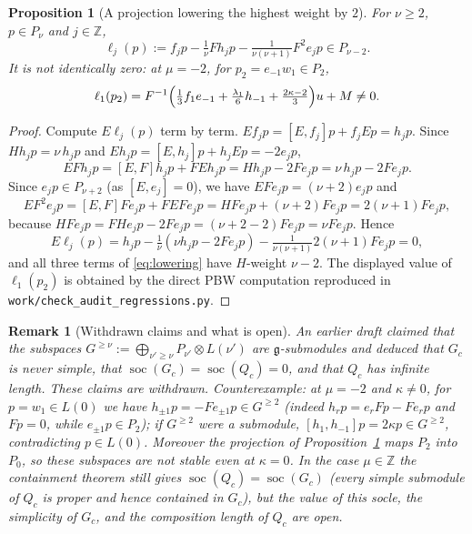 \documentclass[11pt,a4paper]{article}
\newcommand{\Z}{\mathbb Z}
\newcommand{\g}{\mathfrak g}
\newcommand{\soc}{\operatorname{soc}}
\newtheorem{proposition}[theorem]{Proposition}
\newtheorem{remark}[theorem]{Remark}
\begin{document}
\begin{proposition}[A projection lowering the highest weight by $2$]
\label{prop:lowering}
For $\nu\ge2$, $p\in P_\nu$ and $j\in\Z$,
\begin{equation}\label{eq:lowering}
 \ell_j(p):=f_jp-\tfrac1\nu Fh_jp
 -\tfrac{1}{\nu(\nu+1)}F^2e_jp\in P_{\nu-2}.
\end{equation}
It is not identically zero: at $\mu=-2$, for $p_2=e_{-1}w_1\in P_2$,
\[
 \ell_1(p_2)=F^{-1}\Bigl(\tfrac13f_1e_{-1}+\tfrac{\lambda_1}{6}h_{-1}
 +\tfrac{2\kappa-2}{3}\Bigr)u+M\ne0.
\]
\end{proposition}
\begin{proof}
Compute $E\ell_j(p)$ term by term. $Ef_jp=[E,f_j]p+f_jEp=h_jp$. Since
$Hh_jp=\nu\,h_jp$ and $Eh_jp=[E,h_j]p+h_jEp=-2e_jp$,
\[
 EFh_jp=[E,F]h_jp+FEh_jp=Hh_jp-2Fe_jp=\nu\,h_jp-2Fe_jp.
\]
Since $e_jp\in P_{\nu+2}$ (as $[E,e_j]=0$), we have $EFe_jp=(\nu+2)e_jp$
and
\[
 EF^2e_jp=[E,F]Fe_jp+FEFe_jp=HFe_jp+(\nu+2)Fe_jp=2(\nu+1)Fe_jp,
\]
because $HFe_jp=FHe_jp-2Fe_jp=(\nu+2-2)Fe_jp=\nu Fe_jp$. Hence
\[
 E\ell_j(p)=h_jp-\tfrac1\nu(\nu h_jp-2Fe_jp)
 -\tfrac{1}{\nu(\nu+1)}2(\nu+1)Fe_jp=0,
\]
and all three terms of \eqref{eq:lowering} have $H$-weight $\nu-2$. The
displayed value of $\ell_1(p_2)$ is obtained by the direct PBW computation
reproduced in \texttt{work/check\_audit\_regressions.py}.
\end{proof}

\begin{remark}[Withdrawn claims and what is open]
\label{rem:withdrawn}
An earlier draft claimed that the subspaces
$G^{\ge\nu}:=\bigoplus_{\nu'\ge\nu}P_{\nu'}\otimes L(\nu')$ are
$\g$-submodules and deduced that $G_c$ is never simple, that
$\soc(G_c)=\soc(Q_c)=0$, and that $Q_c$ has infinite length. These claims
are withdrawn. Counterexample: at $\mu=-2$ and $\kappa\ne0$, for
$p=w_1\in L(0)$ we have $h_{\pm1}p=-Fe_{\pm1}p\in G^{\ge2}$ (indeed
$h_rp=e_rFp-Fe_rp$ and $Fp=0$, while $e_{\pm1}p\in P_2$); if $G^{\ge2}$
were a submodule, $[h_1,h_{-1}]p=2\kappa p\in G^{\ge2}$, contradicting
$p\in L(0)$. Moreover the projection of Proposition~\ref{prop:lowering}
maps $P_2$ into $P_0$, so these subspaces are not stable even at
$\kappa=0$. In the case $\mu\in\Z$ the containment theorem still gives
$\soc(Q_c)=\soc(G_c)$ (every simple submodule of $Q_c$ is proper and hence
contained in $G_c$), but the value of this socle, the simplicity of $G_c$,
and the composition length of $Q_c$ are open.
\end{remark}
\end{document}
